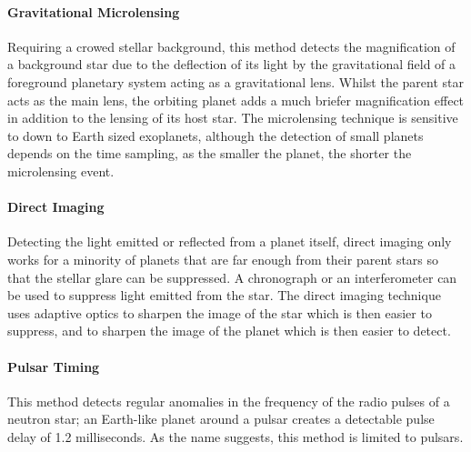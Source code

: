 \documentclass[11pt]{article}
\begin{document}
\hypertarget{gravitational-microlensing}{%
\paragraph{Gravitational Microlensing}\label{gravitational-microlensing}}

Requiring a crowed stellar background, this method detects the
magnification of a background star due to the deflection of its light by
the gravitational field of a foreground planetary system acting as a
gravitational lens. Whilst the parent star acts as the main lens, the
orbiting planet adds a much briefer magnification effect in addition to
the lensing of its host star. The microlensing technique is sensitive to
down to Earth sized exoplanets, although the detection of small planets
depends on the time sampling, as the smaller the planet, the shorter the
microlensing event.

\hypertarget{direct-imaging}{%
\paragraph{Direct Imaging}\label{direct-imaging}}

Detecting the light emitted or reflected from a planet itself, direct
imaging only works for a minority of planets that are far enough from
their parent stars so that the stellar glare can be suppressed. A
chronograph or an interferometer can be used to suppress light emitted
from the star. The direct imaging technique uses adaptive optics to
sharpen the image of the star which is then easier to suppress, and to
sharpen the image of the planet which is then easier to detect.

\hypertarget{pulsar-timing}{%
\paragraph{Pulsar Timing}\label{pulsar-timing}}

This method detects regular anomalies in the frequency of the radio
pulses of a neutron star; an Earth-like planet around a pulsar creates a
detectable pulse delay of 1.2 milliseconds. As the name suggests, this
method is limited to pulsars.
\end{document}
